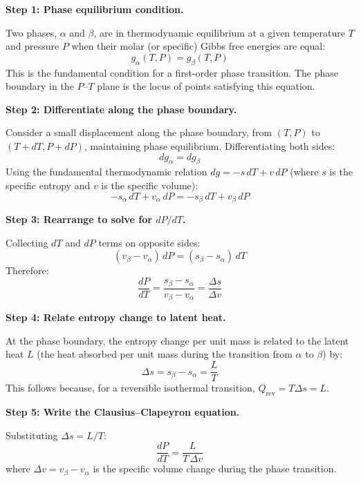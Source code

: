 \textbf{Step 1: Phase equilibrium condition.}

Two phases, $\alpha$ and $\beta$, are in thermodynamic equilibrium at a given temperature $T$ and pressure $P$ when their molar (or specific) Gibbs free energies are equal:
\begin{equation}
g_\alpha(T, P) = g_\beta(T, P)
\end{equation}
This is the fundamental condition for a first-order phase transition. The phase boundary in the $P$--$T$ plane is the locus of points satisfying this equation.

\textbf{Step 2: Differentiate along the phase boundary.}

Consider a small displacement along the phase boundary, from $(T, P)$ to $(T + dT, P + dP)$, maintaining phase equilibrium. Differentiating both sides:
\begin{equation}
dg_\alpha = dg_\beta
\end{equation}
Using the fundamental thermodynamic relation $dg = -s\,dT + v\,dP$ (where $s$ is the specific entropy and $v$ is the specific volume):
\begin{equation}
-s_\alpha\,dT + v_\alpha\,dP = -s_\beta\,dT + v_\beta\,dP
\end{equation}

\textbf{Step 3: Rearrange to solve for $dP/dT$.}

Collecting $dT$ and $dP$ terms on opposite sides:
\begin{equation}
(v_\beta - v_\alpha)\,dP = (s_\beta - s_\alpha)\,dT
\end{equation}
Therefore:
\begin{equation}
\frac{dP}{dT} = \frac{s_\beta - s_\alpha}{v_\beta - v_\alpha} = \frac{\Delta s}{\Delta v}
\end{equation}

\textbf{Step 4: Relate entropy change to latent heat.}

At the phase boundary, the entropy change per unit mass is related to the latent heat $L$ (the heat absorbed per unit mass during the transition from $\alpha$ to $\beta$) by:
\begin{equation}
\Delta s = s_\beta - s_\alpha = \frac{L}{T}
\end{equation}
This follows because, for a reversible isothermal transition, $Q_{\text{rev}} = T\Delta s = L$.

\textbf{Step 5: Write the Clausius--Clapeyron equation.}

Substituting $\Delta s = L/T$:
\begin{equation}
\boxed{\frac{dP}{dT} = \frac{L}{T\,\Delta v}}
\end{equation}
where $\Delta v = v_\beta - v_\alpha$ is the specific volume change during the phase transition.

